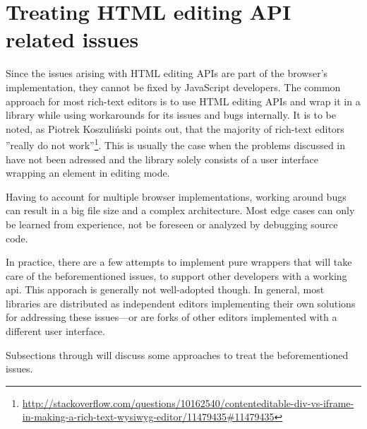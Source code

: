 
\section{Treating HTML editing API related issues}
\label{sec:ed_api_treating}

Since the issues arising with HTML editing APIs are part of the browser's implementation, they cannot be fixed by JavaScript developers. The common approach for most rich-text editors is to use HTML editing APIs and wrap it in a library while using workarounds for its issues and bugs internally. It is to be noted, as Piotrek Koszuli\'{n}ski points out, that the majority of rich-text editors ''really do not work''\footnote{\url{http://stackoverflow.com/questions/10162540/contenteditable-div-vs-iframe-in-making-a-rich-text-wysiwyg-editor/11479435\#11479435}}. This is usually the case when the problems discussed in  have not been adressed and the library solely consists of a user interface wrapping an element in editing mode.

Having to account for multiple browser implementations, working around bugs can result in a big file size and a complex architecture. Most edge cases can only be learned from experience, not be foreseen or analyzed by debugging source code. %

In practice, there are a few attempts to implement pure wrappers that will take care of the beforementioned issues, to support other developers with a working api. This apporach is generally not well-adopted though. In general, most libraries are distributed as independent editors implementing their own solutions for addressing these issues---or are forks of other editors implemented with a different user interface.

Subsections  through  will discuss some approaches to treat the beforementioned issues.





